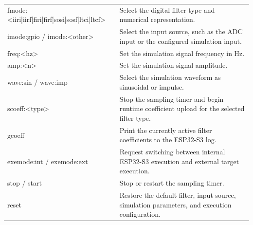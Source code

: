 \begin{table}[H]
\begin{tabularx}{\textwidth}{
        >{\ttfamily\raggedright\arraybackslash}p{}
        >{\raggedright\arraybackslash}X
        }
        fmode:<iiri|iirf|firi|firf|sosi|sosf|ltci|ltcf> & Select the digital filter
        type and numerical representation.                                                                                     \\

        imode:gpio / imode:<other>                      & Select the input source, such as the ADC input or
        the configured simulation input.                                                                                       \\

        freq:<hz>                                       & Set the simulation signal frequency in Hz.                           \\

        amp:<n>                                         & Set the simulation signal amplitude.                                 \\

        wave:sin / wave:imp                             & Select the simulation waveform as sinusoidal or impulse.
        \\

        scoeff:<type>                                   & Stop the sampling timer and begin runtime coefficient upload
        for the selected filter type.                                                                                          \\

        gcoeff                                          & Print the currently active filter coefficients to the ESP32-S3 log.  \\

        exemode:int / exemode:ext                       & Request switching between internal ESP32-S3
        execution and external target execution.                                                                               \\

        stop / start                                    & Stop or restart the sampling timer.                                  \\

        reset                                           & Restore the default filter, input source, simulation parameters, and
        execution configuration.                                                                                               \\


\end{tabularx}
\end{table}
